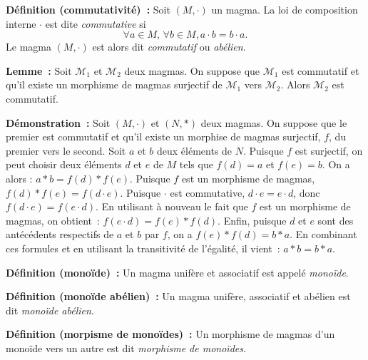     \hfill \square

\medskip

\noindent\textbf{Définition (commutativité) :} Soit $(M,\cdot)$ un magma.
    La loi de composition interne $\cdot$ est dite \textit{commutative} si
    \begin{equation*}
        \forall a \in M, \, \forall b \in M,  
        a \cdot b = b \cdot a.
    \end{equation*}
    Le magma $(M, \cdot)$ est alors dit \textit{commutatif} ou \textit{abélien}.

\medskip

\noindent\textbf{Lemme :} Soit $\mathcal{M}_1$ et $\mathcal{M}_2$ deux magmas.
    On suppose que $\mathcal{M}_1$ est commutatif et qu'il existe un morphisme de magmas surjectif de $\mathcal{M}_1$ vers $\mathcal{M}_2$.
    Alors $\mathcal{M}_2$ est commutatif.

\medskip

\noindent\textbf{Démonstration :} Soit $(M,\cdot)$ et $(N,\ast)$ deux magmas. 
    On suppose que le premier est commutatif et qu'il existe un morphise de magmas surjectif, $f$, du premier vers le second. 
    Soit $a$ et $b$ deux éléments de $N$. 
    Puisque $f$ est surjectif, on peut choisir deux éléments $d$ et $e$ de $M$ tels que $f(d) = a$ et $f(e) = b$.
    On a alors : $a \ast b = f(d) \ast f(e)$.
    Puisque $f$ est un morphisme de magmas, $f(d) \ast f(e) = f(d \cdot e)$.
    Puisque $\cdot$ est commutative, $d \cdot e = e \cdot d$, donc $f(d \cdot e) = f(e \cdot d)$. 
    En utilisant à nouveau le fait que $f$ est un morphisme de magmas, on obtient : $f(e \cdot d) = f(e) \ast f(d)$. 
    Enfin, puisque $d$ et $e$ sont des antécédents respectifs de $a$ et $b$ par $f$, on a $f(e) \ast f(d) = b \ast a$. 
    En combinant ces formules et en utilisant la transitivité de l'égalité, il vient : $a \ast b = b \ast a$.

    \hfill \square

\medskip

\noindent\textbf{Définition (monoïde) :} Un magma unifère et associatif est appelé \textit{monoïde}.

\medskip

\noindent\textbf{Définition (monoïde abélien) :} Un magma unifère, associatif et abélien est dit \textit{monoïde abélien}.

\medskip

\noindent\textbf{Définition (morpisme de monoïdes) :} Un morphisme de magmas d'un monoïde vers un autre est dit \textit{morphisme de monoïdes}.

